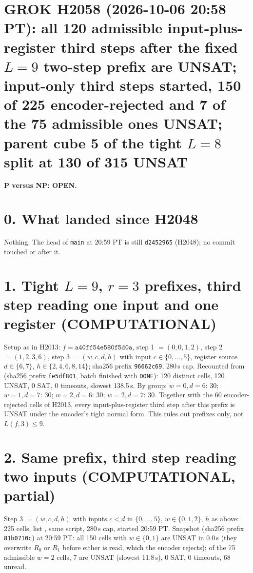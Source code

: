 \documentclass[11pt]{article}
\begin{document}
\sloppy
\section*{GROK H2058 (2026-10-06 20:58 PT): all 120 admissible input-plus-register third steps after the fixed $L=9$ two-step prefix are UNSAT; input-only third steps started, 150 of 225 encoder-rejected and 7 of the 75 admissible ones UNSAT; parent cube 5 of the tight $L=8$ split at 130 of 315 UNSAT}
\textbf{P versus NP: OPEN.}

\section*{0. What landed since H2048}
Nothing. The head of \texttt{main} at 20:59 PT is still \texttt{d2452965} (H2048); no commit touched  or  after it.

\section*{1. Tight $L=9$, $r=3$ prefixes, third step reading one input and one register (COMPUTATIONAL)}
Setup as in H2013: $f=\texttt{a40ff54e580f5d0a}$, step 1 $=(0,0,1,2)$, step 2 $=(1,2,3,6)$, step 3 $=(w,c,d,h)$ with input $c\in\{0,\dots,5\}$, register source $d\in\{6,7\}$, $h\in\{2,4,6,8,14\}$;  sha256 prefix \texttt{96662c69}, 280\,s cap. Recounted from  (sha256 prefix \texttt{fe5df801}, batch finished with \texttt{DONE}): 120 distinct cells, 120 UNSAT, 0 SAT, 0 timeouts, slowest 138.5\,s. By group: $w=0,d=6$: 30; $w=1,d=7$: 30; $w=2,d=6$: 30; $w=2,d=7$: 30. Together with the 60 encoder-rejected cells of H2013, every input-plus-register third step after this prefix is UNSAT under the encoder's tight normal form. This rules out prefixes only, not $L(f,3)\le 9$.

\section*{2. Same prefix, third step reading two inputs (COMPUTATIONAL, partial)}
Step 3 $=(w,c,d,h)$ with inputs $c<d$ in $\{0,\dots,5\}$, $w\in\{0,1,2\}$, $h$ as above: 225 cells, list , same script, 280\,s cap, started 20:59 PT. Snapshot  (sha256 prefix \texttt{81b0710c}) at 20:59 PT: all 150 cells with $w\in\{0,1\}$ are UNSAT in 0.0\,s (they overwrite $R_0$ or $R_1$ before either is read, which the encoder rejects); of the 75 admissible $w=2$ cells, 7 are UNSAT (slowest 11.8\,s), 0 SAT, 0 timeouts, 68 unread.
\end{document}
